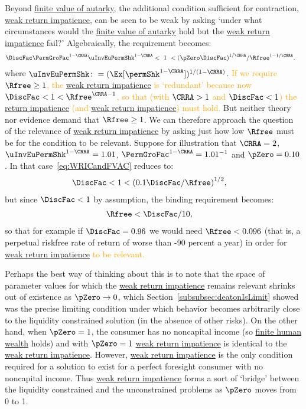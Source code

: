 \documentclass[BufferStockTheory]{subfiles}
\begin{document}
Beyond \hyperlink{FVAC}{finite value of autarky},
the additional condition sufficient for contraction, \hyperlink{WRIC}{weak return impatience}, can be seen to be weak by asking `under what circumstances would the \hyperlink{FVAC}{finite value of autarky} hold but the \hyperlink{WRIC}{weak return impatience} fail?'  Algebraically, the requirement becomes:
%
\begin{align}
  \DiscFac \PermGroFac^{1-\CRRA}\uInvEuPermShk^{1-\CRRA} & < ~ 1 ~ <  {(\pZero \DiscFac)}^{1/\CRRA}/\Rfree^{1-1/\CRRA}. \label{eq:WRICandFVAC}
\end{align}
%
where $\uInvEuPermShk \colon = (\Ex[\permShk^{1-\CRRA}])^{1/(1-\CRRA)}$. \textcolor{orange}{If we require $\Rfree \geq 1$, the \hyperlink{WRIC}{weak return impatience} is `redundant' because now $\DiscFac <1<\Rfree^{\CRRA-1}$, so that (with $\CRRA > 1$ and $\DiscFac<1$) the \hyperlink{RIC}{return impatience} (and \hyperlink{WRIC}{weak return impatience}) must hold.}  But neither theory nor evidence demand that $\Rfree \geq 1$.  We can therefore approach the question of the relevance of \hyperlink{WRIC}{weak return impatience}  by asking just how low $\Rfree$ must be for the condition to be relevant.  Suppose for illustration that $\CRRA=2$, $\uInvEuPermShk^{1-\CRRA}=1.01$, $\PermGroFac^{1-\CRRA}=1.01^{-1}$ and $\pZero = 0.10$.  In that case~\eqref{eq:WRICandFVAC} reduces to:
\begin{align*}
  \DiscFac  & < 1 < {(0.1 \DiscFac/\Rfree)}^{1/2},
\end{align*}
but since $\DiscFac < 1$ by assumption, the binding requirement becomes:
\begin{align*}
  \Rfree  & < \DiscFac/10, \notag
\end{align*}
so that for example if $\DiscFac=0.96$ we would need $\Rfree < 0.096$ (that is, a perpetual riskfree rate of return of worse than -90 percent a year) in order for  \hyperlink{WRIC}{weak return impatience} \textcolor{orange}{to be relevant.} 


Perhaps the best way of thinking about this is to note that the space of parameter values for which the \hyperlink{WRIC}{weak return impatience}  remains relevant shrinks out of existence as $\pZero \rightarrow 0$, which Section~\ref{subsubsec:deatonIsLimit} showed was the precise limiting condition under which behavior becomes arbitrarily close to the liquidity constrained solution (in the absence of other risks).  On the other hand, when $\pZero = 1$, the consumer has no noncapital income (so \hyperlink{FHWC}{finite human wealth} holds) and with $\pZero=1$ \hyperlink{WRIC}{weak return impatience} is identical to the \hyperlink{WRIC}{weak return impatience}. However, \hyperlink{WRIC}{weak return impatience} is the only condition required for a solution to exist for a perfect foresight consumer with no noncapital income.  Thus \hyperlink{WRIC}{weak return impatience} forms a sort of `bridge' between the liquidity constrained and the unconstrained problems as $\pZero$ moves from 0 to 1.
\end{document}
